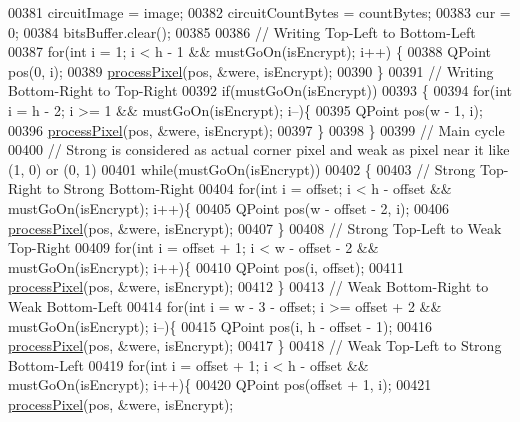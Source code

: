 \begin{DoxyCode}
00381     circuitImage = image;
00382     circuitCountBytes = countBytes;
00383     cur = 0;
00384     bitsBuffer.clear();
00385 
00386     \textcolor{comment}{// Writing Top-Left to Bottom-Left}
00387     \textcolor{keywordflow}{for}(\textcolor{keywordtype}{int} i = 1; i < h - 1 && mustGoOn(isEncrypt); i++) \{
00388         QPoint pos(0, i);
00389         \hyperlink{class_model_p_c_a1171f9fe1550133dc9053a46b4e5bcfd}{processPixel}(pos, &were, isEncrypt);
00390     \}
00391     \textcolor{comment}{// Writing Bottom-Right to Top-Right}
00392     \textcolor{keywordflow}{if}(mustGoOn(isEncrypt))
00393     \{
00394         \textcolor{keywordflow}{for}(\textcolor{keywordtype}{int} i = h - 2; i >= 1 && mustGoOn(isEncrypt); i--)\{
00395             QPoint pos(w - 1, i);
00396             \hyperlink{class_model_p_c_a1171f9fe1550133dc9053a46b4e5bcfd}{processPixel}(pos, &were, isEncrypt);
00397         \}
00398     \}
00399     \textcolor{comment}{// Main cycle}
00400     \textcolor{comment}{// Strong is considered as actual corner pixel and weak as pixel near it like (1, 0) or (0, 1)}
00401     \textcolor{keywordflow}{while}(mustGoOn(isEncrypt))
00402     \{
00403         \textcolor{comment}{// Strong Top-Right to Strong Bottom-Right}
00404         \textcolor{keywordflow}{for}(\textcolor{keywordtype}{int} i = offset; i < h - offset && mustGoOn(isEncrypt); i++)\{
00405             QPoint pos(w - offset - 2, i);
00406             \hyperlink{class_model_p_c_a1171f9fe1550133dc9053a46b4e5bcfd}{processPixel}(pos, &were, isEncrypt);
00407         \}
00408         \textcolor{comment}{// Strong Top-Left to Weak Top-Right}
00409         \textcolor{keywordflow}{for}(\textcolor{keywordtype}{int} i = offset + 1; i < w - offset - 2 && mustGoOn(isEncrypt); i++)\{
00410             QPoint pos(i, offset);
00411             \hyperlink{class_model_p_c_a1171f9fe1550133dc9053a46b4e5bcfd}{processPixel}(pos, &were, isEncrypt);
00412         \}
00413         \textcolor{comment}{// Weak Bottom-Right to Weak Bottom-Left}
00414         \textcolor{keywordflow}{for}(\textcolor{keywordtype}{int} i = w - 3 - offset; i >= offset + 2 && mustGoOn(isEncrypt); i--)\{
00415             QPoint pos(i, h - offset - 1);
00416             \hyperlink{class_model_p_c_a1171f9fe1550133dc9053a46b4e5bcfd}{processPixel}(pos, &were, isEncrypt);
00417         \}
00418         \textcolor{comment}{// Weak Top-Left to Strong Bottom-Left}
00419         \textcolor{keywordflow}{for}(\textcolor{keywordtype}{int} i = offset + 1; i < h - offset && mustGoOn(isEncrypt); i++)\{
00420             QPoint pos(offset + 1, i);
00421             \hyperlink{class_model_p_c_a1171f9fe1550133dc9053a46b4e5bcfd}{processPixel}(pos, &were, isEncrypt);

\end{DoxyCode}
